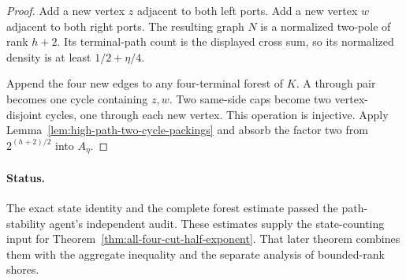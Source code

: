 \begin{proof}
Add a new vertex $z$ adjacent to both left ports.
Add a new vertex $w$ adjacent to both right ports.
The resulting graph $N$ is a normalized two-pole of rank $h+2$.
Its terminal-path count is the displayed cross sum, so its normalized
density is at least $1/2+\eta/4$.

Append the four new edges to any four-terminal forest of $K$.
A through pair becomes one cycle containing $z,w$.
Two same-side caps become two vertex-disjoint cycles, one through each new vertex.
This operation is injective.
Apply Lemma~\ref{lem:high-path-two-cycle-packings} and absorb the factor two
from $2^{(h+2)/2}$ into $A_\eta$.
\end{proof}

\paragraph{Status.}
The exact state identity and the complete forest estimate passed the
path-stability agent's independent audit.
These estimates supply the state-counting input for
Theorem~\ref{thm:all-four-cut-half-exponent}.
That later theorem combines them with the aggregate inequality and the
separate analysis of bounded-rank shores.
